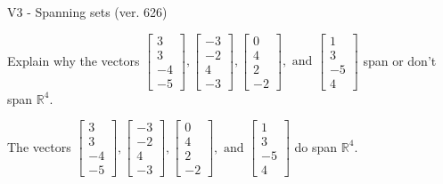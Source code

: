 \begin{exercise}
  \begin{exerciseTitle}V3 - Spanning sets (ver. 626)\end{exerciseTitle}
  \begin{exerciseStatement}
    Explain why the vectors \(\left[\begin{array}{r}
3 \\
3 \\
-4 \\
-5
\end{array}\right] , \left[\begin{array}{r}
-3 \\
-2 \\
4 \\
-3
\end{array}\right] , \left[\begin{array}{r}
0 \\
4 \\
2 \\
-2
\end{array}\right] , \text{ and } \left[\begin{array}{r}
1 \\
3 \\
-5 \\
4
\end{array}\right]\) span or don't span \(\mathbb{R}^4\). 
	


  \end{exerciseStatement}
  \begin{exerciseAnswer}
   The vectors \(\left[\begin{array}{r}
3 \\
3 \\
-4 \\
-5
\end{array}\right] , \left[\begin{array}{r}
-3 \\
-2 \\
4 \\
-3
\end{array}\right] , \left[\begin{array}{r}
0 \\
4 \\
2 \\
-2
\end{array}\right] , \text{ and } \left[\begin{array}{r}
1 \\
3 \\
-5 \\
4
\end{array}\right]\) 
  	 do  
	span \(\mathbb{R}^4\).
  


  \end{exerciseAnswer}
\end{exercise}